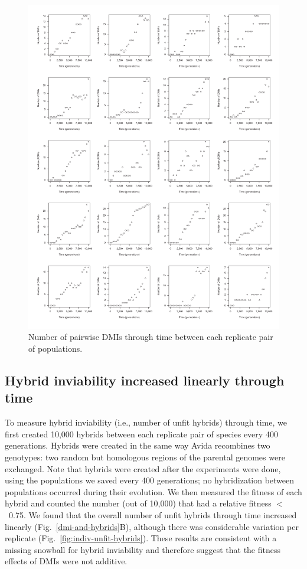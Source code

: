 \begin{doublespace}
\begin{figure}
\begin{center}
\includegraphics[width=0.9\linewidth]{dmi-counts-indiv-plots.pdf}
\end{center}
\caption{Number of pairwise DMIs through time
  between each replicate pair of populations.}
\label{fig:indiv-dmi}
\end{figure}



\subsection{Hybrid inviability increased linearly through time}

To measure hybrid inviability (i.e., number of unfit hybrids) through time,
we first created 10,000 hybrids between each replicate pair of species
every 400 generations.
%
Hybrids were created in the same way Avida recombines two genotypes:
two random but homologous regions of the parental genomes were exchanged.
%
Note that hybrids were created after the experiments were done,
using the populations we saved every 400 generations;
no hybridization between populations occurred during their evolution.
%
We then measured the fitness of each hybrid and counted the number
(out of 10,000) that had a relative fitness $<$~0.75.
%
We found that the overall number of unfit hybrids through time
increased linearly (Fig.~\ref{dmi-and-hybrids}B),
although there was considerable variation per replicate
(Fig.~\ref{fig:indiv-unfit-hybrids}).
%
These results are consistent with a missing snowball for hybrid inviability
and therefore suggest that the fitness effects of DMIs were not additive.




\end{doublespace}
